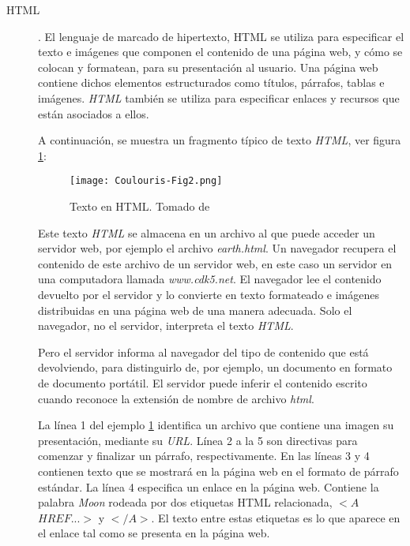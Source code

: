 \begin{description}
	\item[{HTML}].   El lenguaje de marcado de hipertexto, \gls{HTML}   se utiliza para especificar el texto e imágenes que componen el contenido de una página web, y  cómo se colocan y formatean,  para su presentación al usuario. Una página web contiene dichos elementos estructurados como títulos, párrafos, tablas e imágenes. \textit{HTML} también se utiliza para especificar enlaces y  recursos que están asociados a ellos. 
	
	A continuación, se muestra un fragmento típico de texto \textit{HTML}, ver figura \ref{fig:Cou-Fig2}:
	
	
	\begin{figure}%
		\texttt{[image: Coulouris-Fig2.png]}
		\caption{Texto en HTML. Tomado de \CO }
		\label{fig:Cou-Fig2}
	\end{figure}
	
	Este texto \textit{HTML} se almacena en un archivo al que puede acceder un servidor web, por ejemplo  el archivo \textit{earth.html}. Un navegador recupera el contenido de este archivo de un servidor web, en este caso un servidor en una computadora llamada \textit{www.cdk5.net}. El navegador lee el contenido devuelto por 	el servidor y lo convierte en texto formateado e imágenes distribuidas en una página web de una manera adecuada. Solo el navegador, no el servidor, interpreta el texto \textit{HTML}. 
	
	Pero  el servidor informa al navegador del tipo de contenido que está devolviendo, para distinguirlo de, por ejemplo, un documento en formato de documento portátil. El servidor puede inferir el contenido escrito cuando reconoce la extensión de nombre de archivo \textit{html}.
	
	La línea 1 del ejemplo \ref{fig:Cou-Fig2}  identifica un archivo que contiene una imagen  su presentación, mediante su \textit{URL}.
	Línea 2 a la  5 son directivas para comenzar y finalizar un párrafo, respectivamente. 
	En las líneas 3 y 4 contienen texto que se mostrará en la página web en el formato de párrafo estándar.
	La línea 4 especifica un enlace en la página web. Contiene la palabra \textit{Moon}  rodeada 	por dos etiquetas HTML relacionada, $<A$ $HREF...>$  y {$</A>$}. El texto entre estas etiquetas es lo que
	aparece en el enlace tal como se presenta en la página web. 
	

\end{description}
